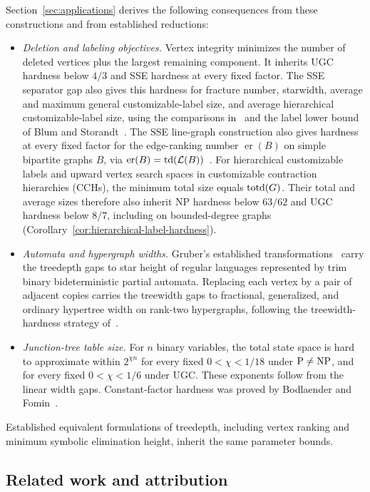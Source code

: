 Section~\ref{sec:applications} derives the following consequences
from these constructions and from established reductions:
\begin{itemize}
 \item \emph{Deletion and labeling objectives.} Vertex integrity
   minimizes the number of deleted vertices plus the largest remaining
   component. It inherits UGC hardness below $4/3$ and SSE hardness at every fixed
   factor. The SSE separator gap also gives this hardness for fracture
   number, starwidth, average and maximum general customizable-label size,
   and average hierarchical customizable-label size, using the comparisons
   in~\cite{GimaEtAlIntegrity} and the label lower bound
   of Blum and Storandt~\cite{BlumStorandt2023}.
   The SSE line-graph construction also gives hardness at every fixed
   factor for the edge-ranking number $\operatorname{er}(B)$ on simple
   bipartite graphs $B$, via
    $\operatorname{er}(B)=\operatorname{td}(\mathcal L(B))$~\cite{BodlaenderRankings}.
   For hierarchical customizable labels and upward vertex search spaces
   in customizable contraction hierarchies (CCHs), the minimum total size
   equals $\operatorname{totd}(G)$. Their total and
   average sizes therefore also inherit NP hardness below $63/62$
   and UGC hardness below $8/7$, including on bounded-degree graphs
   (Corollary~\ref{cor:hierarchical-label-hardness}).
 \item \emph{Automata and hypergraph widths.} Gruber's established
   transformations~\cite{Gruber2008} carry the treedepth gaps to
   star height of regular languages represented by trim binary
   bideterministic partial automata. Replacing each vertex
   by a pair of adjacent copies carries the treewidth gaps to fractional, generalized,
   and ordinary hypertree width on rank-two hypergraphs, following
   the treewidth-hardness strategy of~\cite{Marx2010Fractional}.
 \item \emph{Junction-tree table size.} For $n$ binary variables, the
   total state space is hard to approximate within $2^{\chi n}$
   for every fixed $0<\chi<1/18$ under $\mathrm{P}\ne\mathrm{NP}$, and for
   every fixed $0<\chi<1/6$ under UGC. These exponents
   follow from the linear width gaps. Constant-factor hardness
   was proved by Bodlaender and Fomin~\cite{BodlaenderFomin2005}.
\end{itemize}
Established equivalent formulations of treedepth, including vertex
ranking and minimum symbolic elimination height, inherit the same
parameter bounds.

\subsection{Related work and attribution}

